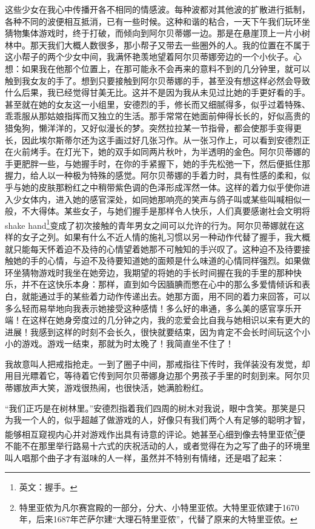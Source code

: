 \par 这些少女在我心中传播开各不相同的情感波。每种波都对其他波的扩散进行抵制，各种不同的波便相互抵消，已有一些时候。这种和谐的粘合，一天下午我们玩环坐猜物集体游戏时，终于打破，而倾向到阿尔贝蒂娜一边。那是在悬崖顶上一片小树林中。那天我们大概人数很多，那小帮子又带去一些圈外的人。我的位置在不属于这小帮子的两个少女中间，我满怀艳羡地望着阿尔贝蒂娜旁边的一个小伙子。心想：如果我在他那个位置上，在那可能永不会再来的意料不到的几分钟里，就可以触到我女友的手了。想到只要接触到阿尔贝蒂娜的手，甚至没有想这样必然会导致什么后果，我已经觉得甘美无比。这并不是因为我从未见过比她的手更好看的手。甚至就在她的女友这一小组里，安德烈的手，修长而又细腻得多，似乎过着特殊、乖乖服从那姑娘指挥而又独立的生活。那手常常在她面前伸得长长的，好似高贵的猎兔狗，懒洋洋的，又好似漫长的梦。突然拉拉某一节指骨，都会使那手变得更长，因此埃尔斯蒂尔还为这手画过好几张习作。从一张习作上，可以看到安德烈正在火前烤手。在灯光下，她的双手如同两片秋叶，为半透明的金色。阿尔贝蒂娜的手更肥胖一些，与她握手时，在你的手紧握下，她的手先松弛一下，然后便抵住那握力，给人以一种极为特殊的感觉。阿尔贝蒂娜的手着力时，具有性感的柔和，似乎与她的皮肤那粉红之中稍带紫色调的色泽形成浑然一体。这样的着力似乎使你进入少女体内，进入她的感官深处，如同她那响亮的笑声与鸽子叫或某些叫喊相似一般，不大得体。某些女子，与她们握手是那样令人快乐，人们真要感谢社会文明将shake hand\footnote{英文：握手。}变成了初次接触的青年男女之间可以允许的行为。阿尔贝蒂娜就在这样的女子之列。如果有什么不近人情的施礼习惯以另一种动作代替了握手，我大概就只能每天怀着迫不及待的心情望着她那不可触知的手兴叹了。这种迫不及待要接触她的手的心情，与迫不及待要知道她的面颊是什么味道的心情同样强烈。如果做环坐猜物游戏时我坐在她旁边，我期望的将她的手长时间握在我的手里的那种快乐，并不在这快乐本身：那样，直到如今因腼腆而憋在心中的那么多爱情倾诉和表白，就能通过手的某些着力动作传递出去。她那方面，用不同的着力来回答，可以多么轻而易举地向我表示她接受这种感情！多么好的串通，多么美的感官享乐开端！在这样在她身旁度过的几分钟之内，我的恋爱会比自我与她相识以来有更大的进展！我感到这样的时刻不会长久，很快就要结束，因为肯定不会长时间玩这个小小的游戏。游戏一结束，那就为时太晚了！我简直坐不住了！
\par 我故意叫人把戒指抢走。一到了圈子中间，那戒指往下传时，我佯装没有发觉，却用目光瞟着它，等待着它传到阿尔贝蒂娜身边那个男孩子手里的时刻到来。阿尔贝蒂娜放声大笑，游戏很热闹，也很快活，她满脸粉红。
\par “我们正巧是在树林里。”安德烈指着我们四周的树木对我说，眼中含笑。那笑是只为我一个人的，似乎超越了做游戏的人，好像只有我们两个人有足够的聪明才智，能够相互窥视内心并对游戏作出具有诗意的评论。她甚至心细到像去特里亚侬\footnote{特里亚侬为凡尔赛宫殿的一部分，分大、小特里亚侬。大特里亚侬建于1670年，后来1687年芒萨尔建“大理石特里亚侬”，代替了原来的大特里亚侬。}便不能不在那里举行路易十六式的庆祝活动的人，或者觉得在为之写了曲子的环境里叫人唱那个曲子才有滋味的人一样，虽然并不特别有情绪，还是唱了起来：
